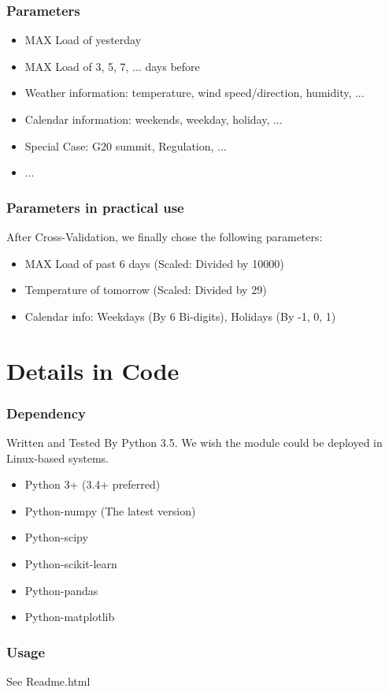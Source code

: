 \begin{frame}
\frametitle{Parameters}
\begin{itemize}
\item MAX Load of yesterday
\item MAX Load of 3, 5, 7, ... days before
\item Weather information: temperature, wind speed/direction, humidity, ...
\item Calendar information: weekends, weekday, holiday, ...
\item Special Case: G20 summit, Regulation, ...
\item ...
\end{itemize}
\end{frame}

\begin{frame}
\frametitle{Parameters in practical use}
After Cross-Validation, we finally chose the following parameters:
\begin{itemize}
\item MAX Load of past 6 days (Scaled: Divided by 10000)
\item Temperature of tomorrow (Scaled: Divided by 29)
\item Calendar info: Weekdays (By 6 Bi-digits), Holidays (By -1, 0, 1)
\end{itemize}
\end{frame}

\section{Details in Code}
\begin{frame}
\frametitle{Dependency}
Written and Tested By Python 3.5. We wish the module could be deployed in Linux-based systems.
\begin{itemize}
	\item Python 3+ (3.4+ preferred)
	\item Python-numpy (The latest version)
	\item Python-scipy
	\item Python-scikit-learn
	\item Python-pandas
	\item Python-matplotlib
\end{itemize}
\end{frame}

\begin{frame}
\frametitle{Usage}
See Readme.html
\end{frame}

